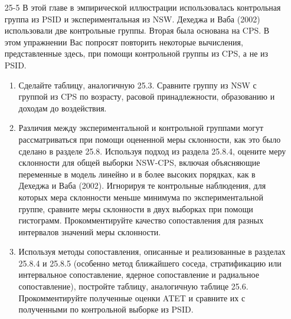 \begin{enumerate}
\item[25-5] В этой главе в эмпирической иллюстрации использовалась контрольная группа из PSID и экспериментальная из NSW. Дехеджа и Ваба (2002) использовали две контрольные группы. Вторая была основана на CPS. В этом упражнении Вас попросят повторить некоторые вычисления, представленные здесь, при помощи контрольной группы из CPS, а не из PSID. 
\begin{enumerate}
\item Сделайте таблицу, аналогичную 25.3. Сравните группу из NSW с группой из CPS по возрасту, расовой принадлежности, образованию и доходам до воздействия.  
\item Различия между экспериментальной и контрольной группами могут рассматриваться при помощи оцененной меры склонности, как это было сделано в разделе 25.8. Используя подход из раздела 25.8.4, оцените меру склонности для общей выборки NSW-CPS, включая объясняющие переменные в модель линейно и в более высоких порядках, как в Дехеджа и Ваба (2002). Игнорируя те контрольные наблюдения, для которых мера склонности меньше минимума по экспериментальной группе, сравните меры склонности в двух выборках при помощи гистограмм. Прокомментируйте качество сопоставления для разных интервалов значений меры склонности. 
\item Используя методы сопоставления, описанные и реализованные в разделах 25.8.4 и 25.8.5 (особенно метод ближайшего соседа, стратификацию или интервальное сопоставление, ядерное сопоставление и радиальное сопоставление), постройте таблицу, аналогичную таблице 25.6. Прокомментируйте полученные оценки ATET и сравните их с полученными по контрольной выборке из PSID. 
\end{enumerate}

\end{enumerate}



